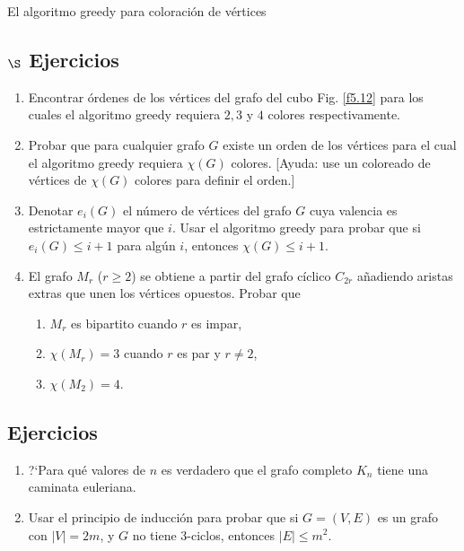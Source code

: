 \begin{section}{El algoritmo greedy para coloración de vértices}

\subsection*{\Large $\S$ Ejercicios}\label{ejercicio5.7} 
	
\begin{enumerate}
\item Encontrar órdenes de los vértices del grafo del cubo Fig. \ref{f5.12} 
para los cuales el algoritmo greedy requiera $2, 3$ y $4$
colores respectivamente.
\item \label{ejercicio5.7.2} Probar que para cualquier grafo $G$ existe un orden de los
vértices para el cual el algoritmo greedy requiera $\chi(G)$
colores. [Ayuda: use un coloreado de vértices de $\chi(G)$ colores
para definir el orden.]
\item Denotar $e_i(G)$ el número de vértices del grafo $G$ cuya valencia es
estrictamente mayor que $i$. Usar el algoritmo greedy para probar
que si $e_i(G) \le i+1$ para algún $i$, entonces $\chi(G) \le
i+1$.
\item El grafo $M_r$ ($r\ge 2$) se obtiene a partir del grafo cíclico $C_{2r}$ añadiendo
aristas extras que unen los vértices opuestos. Probar que
\begin{enumerate}
	\item $M_r$ es bipartito cuando $r$ es impar,
	
	\item $\chi(M_r)=3$ cuando $r$ es par y $r\not= 2$,
	
	\item $\chi(M_2)=4$.
\end{enumerate}
\end{enumerate}


\section{Ejercicios}
\begin{enumerate}
\item ?`Para qué valores de $n$ es verdadero que el grafo completo $K_n$
tiene una caminata euleriana.

\item Usar el principio de inducción para probar que si $G=(V,E)$ es un
grafo con $|V|=2m$, y $G$ no tiene $3$-ciclos, entonces $|E|\le
m^2$.


\end{enumerate}
\end{section}
